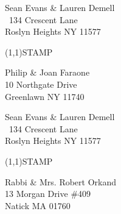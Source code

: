 \documentclass[12pt]{article}
\begin{document}
\begin{minipage}{.5\linewidth} \noindent
Sean Evans \& Lauren Demell\\\ 
134 Crescent Lane\\ 
Roslyn Heights NY 11577
\end{minipage}
\begin{minipage}{.5\linewidth \hspace{-.2in} \vspace{-.3in}}
\begin{flushright}
\framebox(1,1){STAMP}
\end{flushright}
\end{minipage}

\begin{center} \begin{Huge} \vspace*{\fill}
Philip \& Joan Faraone\\
10 Northgate Drive\\
Greenlawn NY 11740\\
\vspace{\fill} \end{Huge} \end{center}

\clearpage

\begin{minipage}{.5\linewidth} \noindent
Sean Evans \& Lauren Demell\\\ 
134 Crescent Lane\\ 
Roslyn Heights NY 11577
\end{minipage}
\begin{minipage}{.5\linewidth \hspace{-.2in} \vspace{-.3in}}
\begin{flushright}
\framebox(1,1){STAMP}
\end{flushright}
\end{minipage}

\begin{center} \begin{Huge} \vspace*{\fill}
Rabbi \& Mrs. Robert Orkand\\
13 Morgan Drive \#409\\
Natick MA 01760\\
\vspace{\fill} \end{Huge} \end{center}

\clearpage
\end{document}
